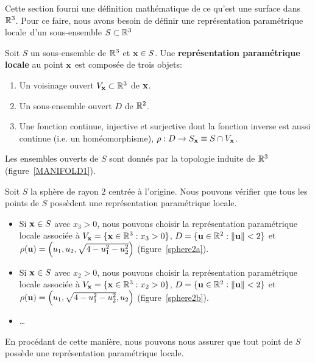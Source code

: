 {Cette section fourni une définition mathématique de ce qu'est une
surface dans $\mathbb{R}^3$.  Pour ce faire, nous avons besoin de définir
une \lgm représentation paramétrique locale\rgm\ d'un sous-ensemble
$S \subset \mathbb{R}^3$ 

Soit $S$ un sous-ensemble de $\mathbb{R}^3$ et $\mathbf{x} \in S$.  Une
{\bfseries représentation paramétrique locale} au point $\mathbf{x}$ est
composée de trois objets:
\begin{enumerate}
\item Un voisinage ouvert $V_{\mathbf{x}} \subset \mathbb{R}^3$ de $\mathbf{x}$.
\item Un sous-ensemble ouvert $D$ de $\mathbb{R}^2$.
\item Une fonction continue, injective et surjective dont la fonction
inverse est aussi continue (i.e. un homéomorphisme),
$\rho:D\rightarrow S_{\mathbf{x}} \equiv S \cap V_{\mathbf{x}}$.
\end{enumerate}
Les ensembles ouverts de $S$ sont donnés par la topologie induite de $\mathbb{R}^3$
(figure~\ref{MANIFOLD1}).


\begin{egg}
Soit $S$ la sphère de rayon $2$ centrée à l'origine.  Nous pouvons
vérifier que tous les points de $S$ possèdent une représentation paramétrique
locale.
\begin{itemize}
\item Si $\mathbf{x} \in S$ avec $x_3>0$, nous pouvons choisir la
représentation paramétrique locale associée à
$V_{\mathbf{x}} = \{ \mathbf{x} \in \mathbb{R}^3 : x_3 >0\}$,
$D = \{ \mathbf{u} \in \mathbb{R}^2 : \|\mathbf{u}\| < 2\}$ et
$\rho(\mathbf{u}) = \left(u_1,u_2,\sqrt{4-u_1^2-u_2^2}\right)$
(figure~\ref{sphere2a}).
\item Si $\mathbf{x} \in S$ avec $x_2>0$, nous
pouvons choisir la représentation paramétrique locale associée à
$V_{\mathbf{x}} = \{ \mathbf{x} \in \mathbb{R}^3 : x_2 >0\}$,
$D = \{ \mathbf{u} \in \mathbb{R}^2 : \|\mathbf{u}\| < 2\}$ et
$\rho(\mathbf{u}) = \left(u_1,\sqrt{4-u_1^2-u_2^2},u_2\right)$
(figure~\ref{sphere2b}).
\item \ldots
\end{itemize}
En procédant de cette manière, nous pouvons nous assurer que tout point de
$S$ possède une représentation paramétrique locale.
\label{sphereRPL}
\end{egg}

}
